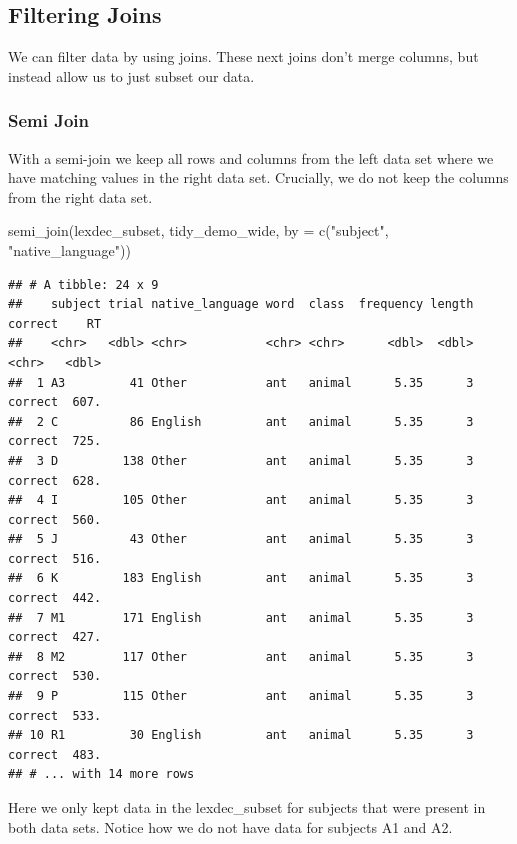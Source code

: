 \documentclass[
]{book}
\newenvironment{Shaded}{\begin{snugshade}}{\end{snugshade}}
\newcommand{\AttributeTok}[1]{\textcolor[rgb]{0.77,0.63,0.00}{#1}}
\newcommand{\FunctionTok}[1]{\textcolor[rgb]{0.00,0.00,0.00}{#1}}
\newcommand{\NormalTok}[1]{#1}
\newcommand{\StringTok}[1]{\textcolor[rgb]{0.31,0.60,0.02}{#1}}
\begin{document}
\hypertarget{filtering-joins}{%
\subsection{Filtering Joins}\label{filtering-joins}}

We can filter data by using joins. These next joins don't merge columns, but instead allow us to just subset our data.

\hypertarget{semi-join}{%
\subsubsection{Semi Join}\label{semi-join}}

With a semi-join we keep all rows and columns from the left data set where we have matching values in the right data set. Crucially, we do not keep the columns from the right data set.

\begin{Shaded}
\begin{Highlighting}[]
\FunctionTok{semi\_join}\NormalTok{(lexdec\_subset, tidy\_demo\_wide, }\AttributeTok{by =} \FunctionTok{c}\NormalTok{(}\StringTok{"subject"}\NormalTok{, }\StringTok{"native\_language"}\NormalTok{))}
\end{Highlighting}
\end{Shaded}

\begin{verbatim}
## # A tibble: 24 x 9
##    subject trial native_language word  class  frequency length correct    RT
##    <chr>   <dbl> <chr>           <chr> <chr>      <dbl>  <dbl> <chr>   <dbl>
##  1 A3         41 Other           ant   animal      5.35      3 correct  607.
##  2 C          86 English         ant   animal      5.35      3 correct  725.
##  3 D         138 Other           ant   animal      5.35      3 correct  628.
##  4 I         105 Other           ant   animal      5.35      3 correct  560.
##  5 J          43 Other           ant   animal      5.35      3 correct  516.
##  6 K         183 English         ant   animal      5.35      3 correct  442.
##  7 M1        171 English         ant   animal      5.35      3 correct  427.
##  8 M2        117 Other           ant   animal      5.35      3 correct  530.
##  9 P         115 Other           ant   animal      5.35      3 correct  533.
## 10 R1         30 English         ant   animal      5.35      3 correct  483.
## # ... with 14 more rows
\end{verbatim}

Here we only kept data in the lexdec\_subset for subjects that were present in both data sets. Notice how we do not have data for subjects A1 and A2.
\end{document}
